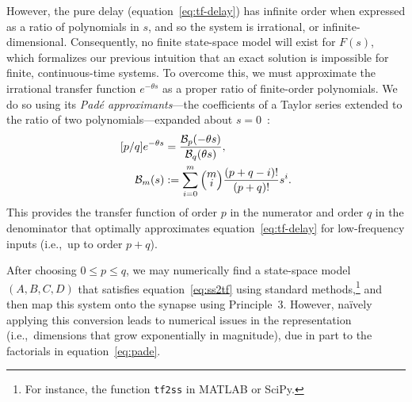 \documentclass[12pt]{article}
\theoremstyle{definition}
\let\originalleft\left
\let\originalright\right
\renewcommand{\left}{\mathopen{}\mathclose\bgroup\originalleft}
\renewcommand{\right}{\aftergroup\egroup\originalright}
\newenvironment{hpmatrix}{\begingroup\def\arraystretch{0.5}\begin{pmatrix}}{\end{pmatrix}\endgroup\ignorespacesafterend}
\begin{document}
However, the pure delay (equation~\ref{eq:tf-delay}) has infinite order when expressed as a ratio of polynomials in $s$, and so the system is irrational, or infinite-dimensional.
Consequently, no finite state-space model will exist for $F(s)$, which formalizes our previous intuition that an exact solution is impossible for finite, continuous-time systems.
To overcome this, we must approximate the irrational transfer function $e^{-\theta s}$ as a proper ratio of finite-order polynomials.
We do so using its \emph{Pad\'e approximants}---the coefficients of a Taylor series extended to the ratio of two polynomials---expanded about $s=0$~\citep{Pade1892, vajta2000some}:
\begin{equation} \label{eq:pade}
\begin{aligned}
\left[ p/q \right] e^{-\theta s} &= \frac{\mathcal{B}_{p}(-\theta s)}{\mathcal{B}_{q}(\theta s)} \text{,} \\
\quad \mathcal{B}_m(s) &:= \sum_{i=0}^m \begin{hpmatrix}m \\ i\end{hpmatrix} \frac{(p + q - i)!}{(p + q)!} s^i \text{.}
\end{aligned}
\end{equation}
This provides the transfer function of order $p$ in the numerator and order $q$ in the denominator that optimally approximates equation~\ref{eq:tf-delay} for low-frequency inputs (i.e.,~up to order $p + q$).

After choosing $0 \le p \le q$, we may numerically find a state-space model $(A\text{,}\, B\text{,}\, C\text{,}\, D)$ that satisfies equation~\ref{eq:ss2tf} using standard methods,\footnote{
For instance, the function \texttt{tf2ss} in MATLAB or SciPy.}
and then map this system onto the synapse using Principle~3.
However, na\"ively applying this conversion leads to numerical issues in the representation (i.e.,~dimensions that grow exponentially in magnitude), due in part to the factorials in equation~\ref{eq:pade}.
\end{document}
